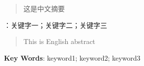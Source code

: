 \clearpage
\fancyhead{}
\begin{abstract}
这是中文摘要
\end{abstract}

{：关键字一；关键字二；关键字三}

\newpage
{} %
\renewcommand{\abstractname}{\fontsize{14}{21}\textbf{Abstract}}
\fancyhead{}
\begin{abstract}
This is English abstract
\end{abstract}

{\noindent\textbf{Key Words}: keyword1; keyword2; keyword3}